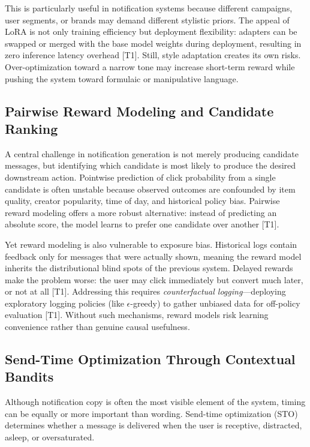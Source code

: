 \documentclass[sigconf]{acmart}
\begin{document}
This is particularly useful in notification systems because different campaigns, user segments, or brands may demand different stylistic priors. The appeal of LoRA is not only training efficiency but deployment flexibility: adapters can be swapped or merged with the base model weights during deployment, resulting in zero inference latency overhead \cite{han2024parameter} [T1]. Still, style adaptation creates its own risks. Over-optimization toward a narrow tone may increase short-term reward while pushing the system toward formulaic or manipulative language.

\subsection{Pairwise Reward Modeling and Candidate Ranking}

A central challenge in notification generation is not merely producing candidate messages, but identifying which candidate is most likely to produce the desired downstream action. Pointwise prediction of click probability from a single candidate is often unstable because observed outcomes are confounded by item quality, creator popularity, time of day, and historical policy bias. Pairwise reward modeling offers a more robust alternative: instead of predicting an absolute score, the model learns to prefer one candidate over another \cite{bie2026pushgen} [T1].

Yet reward modeling is also vulnerable to exposure bias. Historical logs contain feedback only for messages that were actually shown, meaning the reward model inherits the distributional blind spots of the previous system. Delayed rewards make the problem worse: the user may click immediately but convert much later, or not at all \cite{thompson2024} [T1]. Addressing this requires \textit{counterfactual logging}---deploying exploratory logging policies (like $\epsilon$-greedy) to gather unbiased data for off-policy evaluation \cite{joachims2018deep} [T1]. Without such mechanisms, reward models risk learning convenience rather than genuine causal usefulness.

\subsection{Send-Time Optimization Through Contextual Bandits}

Although notification copy is often the most visible element of the system, timing can be equally or more important than wording. Send-time optimization (STO) determines whether a message is delivered when the user is receptive, distracted, asleep, or oversaturated. 
\end{document}
